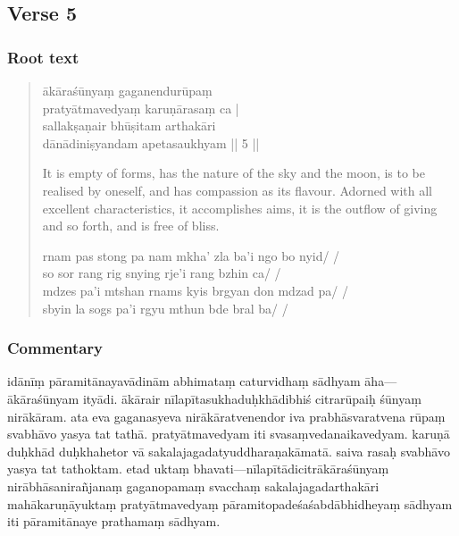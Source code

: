 \documentclass[12pt]{article}
\newcommand{\emdash} {\hspace{0em}—\hspace{0em}}
\begin{document}
\subsection{Verse 5}
\subsubsection{Root text}
\begin{quote}
	ākāraśūnyaṃ gaganendurūpaṃ \\
	pratyātmavedyaṃ karuṇārasaṃ ca |\\
	sallakṣaṇair bhūṣitam\footnoteB{
		bhūṣitam] \EDD ; bhuṣitam \MS
	} arthakāri \\
	dānādiniṣyandam apetasaukhyam || 5 ||

	It is empty of forms, has the nature of the sky and the moon, is to be realised by oneself, and has compassion as its flavour.
	Adorned with all excellent characteristics, it accomplishes aims, it is the outflow of giving and so forth, and is free of bliss.

	rnam pas stong pa nam mkha' zla ba'i ngo bo nyid/ /\\
	so sor rang rig snying rje'i rang bzhin ca/ /\\
	mdzes pa'i mtshan rnams kyis brgyan don mdzad pa/ /\\
	sbyin la sogs pa'i rgyu mthun bde bral ba/ /
\end{quote}

\subsubsection{Commentary}
idānīṃ pāramitānayavādinām abhimataṃ\footnoteB{
	abhimataṃ] \EDD; abhimata \MS
} caturvidhaṃ sādhyam āha\emdash ākāraśūnyam ityādi.
ākārair nīlapītasukhaduḥkhādibhiś citrarūpaiḥ śūnyaṃ nirākāram.
ata eva gaganasyeva nirākāratvenendor iva prabhāsvaratvena rūpaṃ svabhāvo yasya tat tathā.
pratyātmavedyam iti svasaṃvedanaikavedyam.\footnoteB{
	svasaṃvedanaikavedyam] \EDD\ (\emd) (°vedyaṃ); svasaṃvedyanaikavedyaṃ \MS
}
karuṇā duḥkhād\footnoteB{
	karuṇā duḥkhād] \MS; karuṇāduḥkhā° \EDD
} duḥkhahetor vā sakalajagadatyuddharaṇakāmatā.
saiva rasaḥ svabhāvo yasya tat tathoktam.
etad uktaṃ bhavati\emdash nīlapītādicitrākāraśūnyaṃ nirābhāsanirañjanaṃ gaganopamaṃ svacchaṃ sakalajagadarthakāri mahākaruṇāyuktaṃ pratyātmavedyaṃ pāramitopadeśaśabdābhidheyaṃ sādhyam iti pāramitānaye prathamaṃ sādhyam.\\
\end{document}
